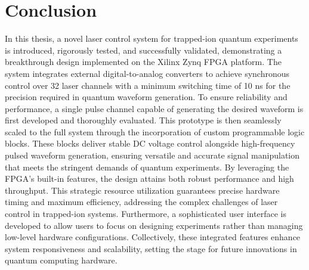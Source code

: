 \chapter{Conclusion}

In this thesis, a novel laser control system for trapped-ion quantum experiments is introduced, rigorously tested, and successfully validated, demonstrating a breakthrough design implemented on the Xilinx Zynq FPGA platform. The system integrates external digital-to-analog converters to achieve synchronous control over 32 laser channels with a minimum switching time of 10 ns for the precision required in quantum waveform generation. To ensure reliability and performance, a single pulse channel capable of generating the desired waveform is first developed and thoroughly evaluated. This prototype is then seamlessly scaled to the full system through the incorporation of custom programmable logic blocks. These blocks deliver stable DC voltage control alongside high-frequency pulsed waveform generation, ensuring versatile and accurate signal manipulation that meets the stringent demands of quantum experiments. By leveraging the FPGA's built-in features, the design attains both robust performance and high throughput. This strategic resource utilization guarantees precise hardware timing and maximum efficiency, addressing the complex challenges of laser control in trapped-ion systems. Furthermore, a sophisticated user interface is developed to allow users to focus on designing experiments rather than managing low-level hardware configurations. Collectively, these integrated features enhance system responsiveness and scalability, setting the stage for future innovations in quantum computing hardware.